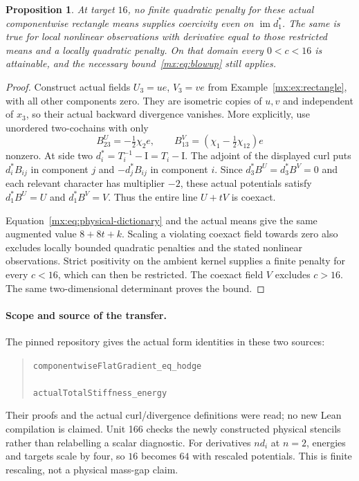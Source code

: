 \documentclass[11pt]{article}
\newtheorem{matrixProposition}[theorem]{Proposition}
\providecommand{\im}{\operatorname{im}}
\providecommand{\id}{\mathrm I}
\begin{document}
\begin{matrixProposition}\label{mx:prop:coexact}
At target $16$, no finite quadratic penalty for these actual componentwise
rectangle means supplies coercivity even on $\im d_1^*$. The same is true
for local nonlinear observations with derivative equal to those restricted
means and a locally quadratic penalty. On that domain every $0<c<16$ is
attainable, and the necessary bound~\eqref{mx:eq:blowup} still applies.
\end{matrixProposition}
\begin{proof}
Construct actual fields $U_3=ue$, $V_3=ve$ from Example~\ref{mx:ex:rectangle},
with all other components zero. They are isometric copies of $u,v$ and
independent of $x_3$, so their actual backward divergence vanishes.
More explicitly, use unordered two-cochains with only
\[
 B^U_{23}=-\tfrac12\chi_2 e,\qquad
 B^V_{13}=(\chi_1-\tfrac12\chi_{12})e
\]
nonzero. At side two $d_i^*=T_i^{-1}-\id=T_i-\id$. The adjoint of the
displayed curl puts $d_i^*B_{ij}$ in component $j$ and $-d_j^*B_{ij}$ in
component $i$. Since $d_3^*B^U=d_3^*B^V=0$ and each relevant character
has multiplier $-2$, these actual potentials satisfy $d_1^*B^U=U$ and
$d_1^*B^V=V$. Thus the entire line $U+tV$ is coexact.

Equation~\eqref{mx:eq:physical-dictionary} and the actual means give the same
augmented value $8+8t+k$. Scaling a violating coexact field towards zero
also excludes locally bounded quadratic penalties and the stated nonlinear
observations. Strict positivity on the ambient kernel supplies a finite
penalty for every $c<16$, which can then be restricted. The coexact field
$V$ excludes $c>16$. The same two-dimensional determinant proves the bound.
\end{proof}

\paragraph{Scope and source of the transfer.}
The pinned repository gives the actual form identities in these two sources:
\begin{quote}\small
\texttt{componentwiseFlatGradient\_eq\_hodge}\\
\\[4pt]
\texttt{actualTotalStiffness\_energy}\\
\end{quote}
Their proofs and the actual curl/divergence definitions were read; no new Lean compilation is
claimed. Unit 166 checks the newly constructed physical stencils rather
than relabelling a scalar diagnostic. For derivatives $nd_i$ at $n=2$,
energies and targets scale by four, so $16$ becomes $64$ with rescaled
potentials. This is finite rescaling, not a physical mass-gap claim.
\end{document}
